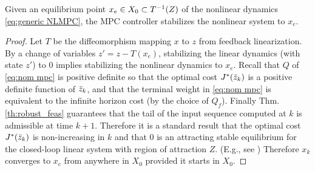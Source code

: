 
\begin{theorem}[Stability]
	\label{thm:stability}
Given an equilibrium point $x_e \in X_0 \subset T^{-1}(Z)$ of the nonlinear dynamics \eqref{eq:generic NLMPC}, the MPC controller stabilizes the nonlinear system to $x_e$.
\end{theorem}

\begin{proof}
Let $T$ be the diffeomorphism mapping $x$ to $z$ from feedback linearization.
By a change of variables $z' = z - T(x_e)$, stabilizing the linear dynamics (with state $z'$) to 0 implies stabilizing the nonlinear dynamics to $x_e$.
Recall that $Q$ of  \eqref{eq:nom mpc} is positive definite so that the optimal cost $J^*(\bar{z}_{k})$ is a positive definite function of $\bar{z}_{k}$, and that the terminal weight in \eqref{eq:nom mpc} is equivalent to the infinite horizon cost (by the choice of $Q_f$). 
Finally Thm.  \ref{th:robust_feas} guarantees that the tail of the input sequence computed at $k$ is admissible at time $k+1$. 
Therefore it is a standard result that the optimal cost $J^{*}(\bar{z}_{k})$ is non-increasing in $k$ and that $0$ is an attracting stable equilibrium for the closed-loop linear system with region of attraction $Z$. (E.g., see \cite{CannonK15MPC} )
Therefore $x_k$ converges to $x_e$ from anywhere in $X_0$ provided it starts in $X_0$.
\end{proof}